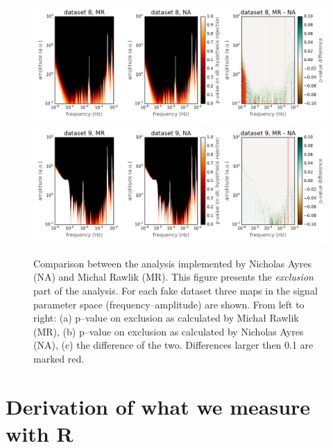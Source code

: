 \begin{figure}[tb]
  \centering \includegraphics[width=0.45\linewidth]{gfx/axions/comparison/comparison_exclusion_dataset8.png}
  \centering \includegraphics[width=0.45\linewidth]{gfx/axions/comparison/comparison_exclusion_dataset9.png}
  \caption{Comparison between the analysis implemented by Nicholas Ayres (NA) and Michal  Rawlik (MR). This figure presents the \emph{exclusion} part of the analysis. For each fake dataset three maps in the signal parameter space (frequency--amplitude) are shown. From left to right: (a) p--value on exclusion as calculated by Michał Rawlik (MR), (b) p--value on exclusion as calculated by Nicholas Ayres (NA), (c) the difference of the two. Differences larger then 0.1 are marked red.}
  \label{fig:comparison_exclusion}
\end{figure}

\section{Derivation of what we measure with R}
\label{Sec:R_derivation}

